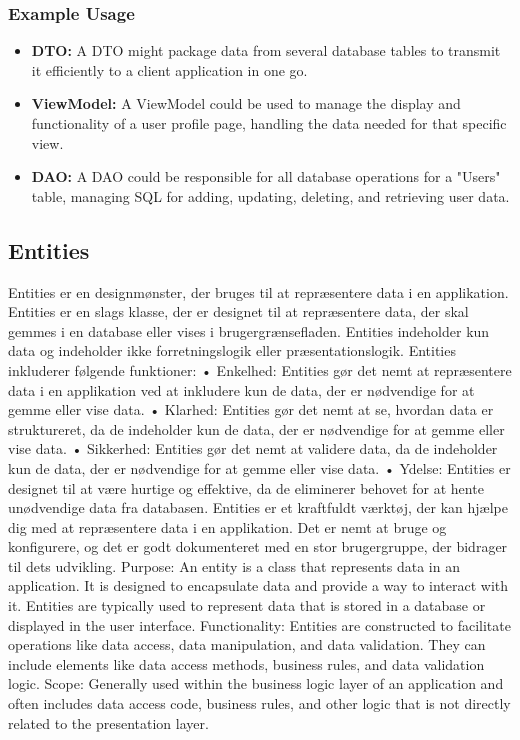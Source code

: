 \subsubsection{Example Usage}
\begin{itemize}
    \item \textbf{DTO:} A DTO might package data from several database tables to transmit it efficiently to a client application in one go.
    \item \textbf{ViewModel:} A ViewModel could be used to manage the display and functionality of a user profile page, handling the data needed for that specific view.
    \item \textbf{DAO:} A DAO could be responsible for all database operations for a "Users" table, managing SQL for adding, updating, deleting, and retrieving user data.
\end{itemize}

\subsection{Entities}
Entities er en designmønster, der bruges til at repræsentere data i en applikation. Entities er en slags klasse, der er designet til at repræsentere data, der skal gemmes i en database eller vises i brugergrænsefladen. Entities indeholder kun data og indeholder ikke forretningslogik eller præsentationslogik.
Entities inkluderer følgende funktioner:
•	Enkelhed: Entities gør det nemt at repræsentere data i en applikation ved at inkludere kun de data, der er nødvendige for at gemme eller vise data.
•	Klarhed: Entities gør det nemt at se, hvordan data er struktureret, da de indeholder kun de data, der er nødvendige for at gemme eller vise data.
•	Sikkerhed: Entities gør det nemt at validere data, da de indeholder kun de data, der er nødvendige for at gemme eller vise data.
•	Ydelse: Entities er designet til at være hurtige og effektive, da de eliminerer behovet for at hente unødvendige data fra databasen.
Entities er et kraftfuldt værktøj, der kan hjælpe dig med at repræsentere data i en applikation. Det er nemt at bruge og konfigurere, og det er godt dokumenteret med en stor brugergruppe, der bidrager til dets udvikling.
Purpose: An entity is a class that represents data in an application. It is designed to encapsulate data and provide a way to interact with it. Entities are typically used to represent data that is stored in a database or displayed in the user interface.
Functionality: Entities are constructed to facilitate operations like data access, data manipulation, and data validation. They can include elements like data access methods, business rules, and data validation logic.
Scope: Generally used within the business logic layer of an application and often includes data access code, business rules, and other logic that is not directly related to the presentation layer.




